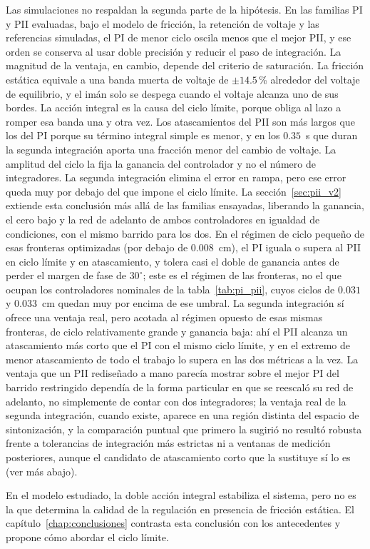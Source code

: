 Las simulaciones no respaldan la segunda parte de la hipótesis. En las familias PI y PII evaluadas, bajo el modelo de fricción, la retención de voltaje y las referencias simuladas, el PI de menor ciclo oscila menos que el mejor PII, y ese orden se conserva al usar doble precisión y reducir el paso de integración. La magnitud de la ventaja, en cambio, depende del criterio de saturación. La fricción estática equivale a una banda muerta de voltaje de $\pm14.5$\,\% alrededor del voltaje de equilibrio, y el imán solo se despega cuando el voltaje alcanza uno de sus bordes. La acción integral es la causa del ciclo límite, porque obliga al lazo a romper esa banda una y otra vez. Los atascamientos del PII son más largos que los del PI porque su término integral simple es menor, y en los $0.35$~s que duran la segunda integración aporta una fracción menor del cambio de voltaje. La amplitud del ciclo la fija la ganancia del controlador y no el número de integradores. La segunda integración elimina el error en rampa, pero ese error queda muy por debajo del que impone el ciclo límite. La sección~\ref{sec:pii_v2} extiende esta conclusión más allá de las familias ensayadas, liberando la ganancia, el cero bajo y la red de adelanto de ambos controladores en igualdad de condiciones, con el mismo barrido para los dos. En el régimen de ciclo pequeño de esas fronteras optimizadas (por debajo de $0.008$~cm), el PI iguala o supera al PII en ciclo límite y en atascamiento, y tolera casi el doble de ganancia antes de perder el margen de fase de $30^\circ$; este es el régimen de las fronteras, no el que ocupan los controladores nominales de la tabla~\ref{tab:pi_pii}, cuyos ciclos de $0.031$ y $0.033$~cm quedan muy por encima de ese umbral. La segunda integración sí ofrece una ventaja real, pero acotada al régimen opuesto de esas mismas fronteras, de ciclo relativamente grande y ganancia baja: ahí el PII alcanza un atascamiento más corto que el PI con el mismo ciclo límite, y en el extremo de menor atascamiento de todo el trabajo lo supera en las dos métricas a la vez. La ventaja que un PII rediseñado a mano parecía mostrar sobre el mejor PI del barrido restringido dependía de la forma particular en que se reescaló su red de adelanto, no simplemente de contar con dos integradores; la ventaja real de la segunda integración, cuando existe, aparece en una región distinta del espacio de sintonización, y la comparación puntual que primero la sugirió no resultó robusta frente a tolerancias de integración más estrictas ni a ventanas de medición posteriores, aunque el candidato de atascamiento corto que la sustituye sí lo es (ver más abajo).

En el modelo estudiado, la doble acción integral estabiliza el sistema, pero no es la que determina la calidad de la regulación en presencia de fricción estática. El capítulo~\ref{chap:conclusiones} contrasta esta conclusión con los antecedentes y propone cómo abordar el ciclo límite.

\FloatBarrier
